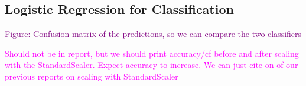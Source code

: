 \subsection{Logistic Regression for Classification}
\textcolor{purple}{Figure: Confusion matrix of the predictions, so we can compare the two classifiers}

\textcolor{magenta}{Should not be in report, but we should print accuracy/cf before and after scaling with the StandardScaler. Expect accuracy to increase. We can just cite on of our previous reports on scaling with StandardScaler}



